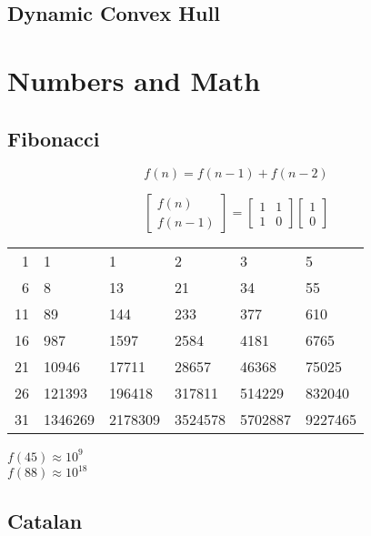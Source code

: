 \documentclass[twocolumn]{article}
\begin{document}
\subsection{Dynamic Convex Hull}


\section{Numbers and Math}

\subsection{Fibonacci}

$$f(n)=f(n-1)+f(n-2)$$

\begin{equation*}
    \begin{bmatrix}
        f(n) \\
        f(n - 1)
    \end{bmatrix}
    =
    \begin{bmatrix}
        1 & 1 \\
        1 & 0
    \end{bmatrix}
    \begin{bmatrix}
        1 \\
        0
    \end{bmatrix}
\end{equation*}

\begin{tabular}{r|lllll}
    1 & 1 & 1 & 2 & 3 & 5 \\
    6 & 8 & 13 & 21 & 34 & 55\\
    11 & 89 & 144 & 233 & 377 & 610 \\
    16 & 987 & 1597 & 2584 & 4181 & 6765\\
    21 & 10946 & 17711 & 28657 & 46368 & 75025 \\
    26 & 121393 & 196418 & 317811 & 514229 & 832040 \\
    31 & 1346269 & 2178309 & 3524578 & 5702887 & 9227465 \\
\end{tabular}

$f(45) \approx 10^9$\\
$f(88) \approx 10^{18}$

\subsection{Catalan}
\end{document}
